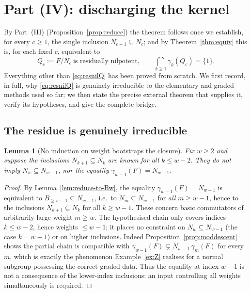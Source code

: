 \documentclass{amsart}
\newtheorem{lemma}{Lemma}
\theoremstyle{definition}
\theoremstyle{remark}
\begin{document}
\section{Part (IV): discharging the kernel}\label{sec:final}

By Part~(III) (Proposition~\ref{prop:reduce}) the theorem follows once we
establish, for every $c\ge1$, the single inclusion $N_{c+1}\subseteq N_c$; and by
Theorem~\ref{thm:equiv} this is, for each fixed $c$, equivalent to
\begin{equation}\label{eq:resnilQ}
Q_c:=F/N_c\ \text{is residually nilpotent},\qquad
\textstyle\bigcap_{k\ge1}\gamma_k(Q_c)=\{1\}.
\end{equation}
Everything other than \eqref{eq:resnilQ} has been proved from scratch. We first
record, in full, why \eqref{eq:resnilQ} is genuinely irreducible to the elementary
and graded methods used so far; we then state the precise external theorem that
supplies it, verify its hypotheses, and give the complete bridge.

\subsection{The residue is genuinely irreducible}

\begin{lemma}[No induction on weight bootstraps the closure]\label{lem:noind}
Fix $w\ge2$ and suppose the inclusions $N_{k+1}\subseteq N_k$ are known for all
$k\le w-2$. They do not imply $N_w\subseteq N_{w-1}$, nor the equality
$\gamma_{w-1}(F)=N_{w-1}$.
\end{lemma}

\begin{proof}
By Lemma~\ref{lem:reduce-to-Bw}, the equality $\gamma_{w-1}(F)=N_{w-1}$ is
equivalent to $B_{\ge w-1}\subseteq N_{w-1}$, i.e.\ to $N_m\subseteq N_{w-1}$ for
\emph{all} $m\ge w-1$, hence to the inclusions $N_{k+1}\subseteq N_k$ for all
$k\ge w-1$. These concern basic commutators of arbitrarily large weight
$m\ge w$. The hypothesised chain only covers indices $k\le w-2$, hence weights
$\le w-1$; it places no constraint on $N_w\subseteq N_{w-1}$ (the case $k=w-1$) or
on higher inclusions. Indeed Proposition~\ref{prop:moddescent} shows the partial
chain is compatible with $\gamma_{w-1}(F)\subsetneq N_{w-1}\,\gamma_m(F)$ for every
$m$, which is exactly the phenomenon Example~\ref{ex:Z} realises for a normal
subgroup possessing the correct graded data. Thus the equality at index $w-1$ is
not a consequence of the lower-index inclusions: an input controlling all weights
simultaneously is required.
\end{proof}
\end{document}
